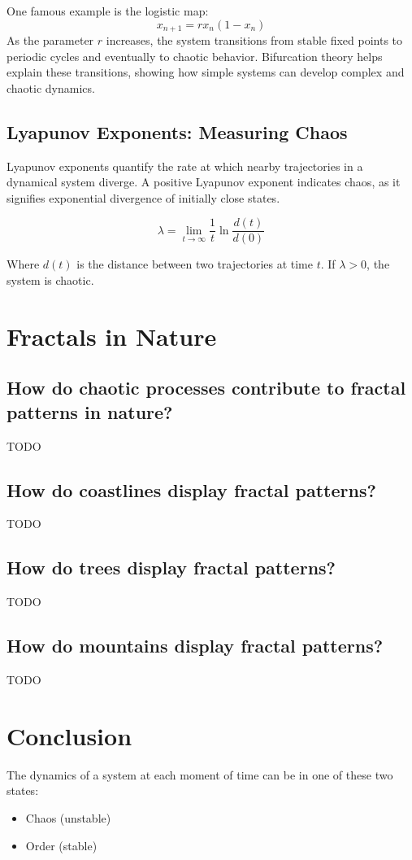 \documentclass[12pt]{article}
\begin{document}
One famous example is the logistic map:
\[
x_{n+1} = r x_n (1 - x_n)
\]
As the parameter \( r \) increases, the system transitions from stable fixed points to periodic cycles and eventually to chaotic behavior. Bifurcation theory helps explain these transitions, showing how simple systems can develop complex and chaotic dynamics.

\subsection{Lyapunov Exponents: Measuring Chaos}
Lyapunov exponents quantify the rate at which nearby trajectories in a dynamical system diverge. A positive Lyapunov exponent indicates chaos, as it signifies exponential divergence of initially close states.

\[
\lambda = \lim_{t \to \infty} \frac{1}{t} \ln \frac{d(t)}{d(0)}
\]

Where \( d(t) \) is the distance between two trajectories at time \( t \). If \( \lambda > 0 \), the system is chaotic.

\section{Fractals in Nature}
\subsection{How do chaotic processes contribute to fractal patterns in nature?}
TODO

\subsection{How do coastlines display fractal patterns?}
TODO

\subsection{How do trees display fractal patterns?}
TODO

\subsection{How do mountains display fractal patterns?}
TODO

\section{Conclusion}

The dynamics of a system at each moment of time can be in one of these two states:
\begin{itemize}
    \item Chaos (unstable)
    \item Order (stable)
\end{itemize}
\end{document}

